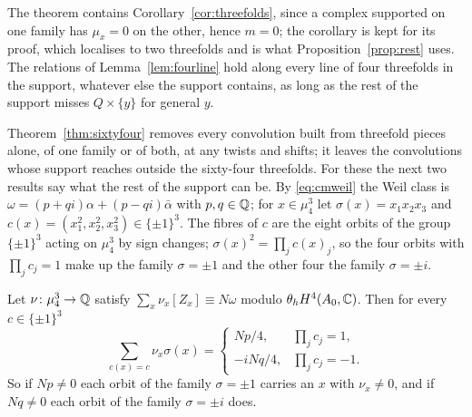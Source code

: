The theorem contains Corollary~\ref{cor:threefolds}, since a complex supported on one family has $\mu_{x}=0$ on the other, hence $m=0$; the corollary is kept for its proof, which localises to two threefolds and is what Proposition~\ref{prop:rest} uses. The relations of Lemma~\ref{lem:fourline} hold along every line of four threefolds in the support, whatever else the support contains, as long as the rest of the support misses $Q\times\{y\}$ for general $y$.

Theorem~\ref{thm:sixtyfour} removes every convolution built from threefold pieces alone, of one family or of both, at any twists and shifts; it leaves the convolutions whose support reaches outside the sixty-four threefolds. For these the next two results say what the rest of the support can be. By \eqref{eq:cmweil} the Weil class is $\omega=(p+qi)\alpha+(p-qi)\bar\alpha$ with $p,q\in\mathbb{Q}$; for $x\in\mu_{4}^{3}$ let $\sigma(x)=x_{1}x_{2}x_{3}$ and $c(x)=(x_{1}^{2},x_{2}^{2},x_{3}^{2})\in\{\pm1\}^{3}$. The fibres of $c$ are the eight orbits of the group $\{\pm1\}^{3}$ acting on $\mu_{4}^{3}$ by sign changes; $\sigma(x)^{2}=\prod_{j}c(x)_{j}$, so the four orbits with $\prod_{j}c_{j}=1$ make up the family $\sigma=\pm1$ and the other four the family $\sigma=\pm i$.

\begin{lemma}\label{lem:orbits}
Let $\nu\colon\mu_{4}^{3}\to\mathbb{Q}$ satisfy $\sum_{x}\nu_{x}[Z_{x}]\equiv N\omega$ modulo $\theta_{h}H^{4}(A_{0},\mathbb{C})$. Then for every $c\in\{\pm1\}^{3}$
\[
\sum_{c(x)=c}\nu_{x}\sigma(x)=\begin{cases}Np/4,&\prod_{j}c_{j}=1,\\ -iNq/4,&\prod_{j}c_{j}=-1.\end{cases}
\]
So if $Np\ne0$ each orbit of the family $\sigma=\pm1$ carries an $x$ with $\nu_{x}\ne0$, and if $Nq\ne0$ each orbit of the family $\sigma=\pm i$ does.
\end{lemma}

